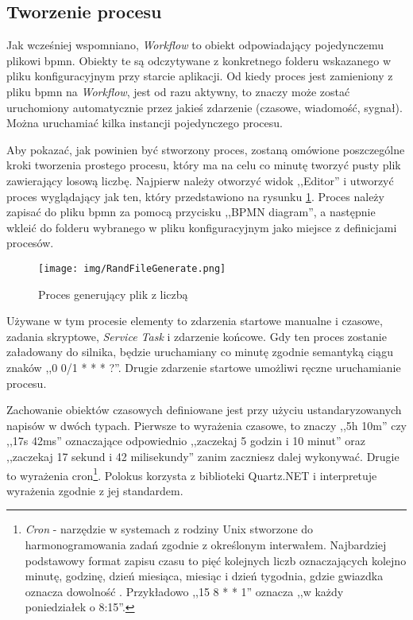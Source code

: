 \documentclass[declaration,shortabstract,mgr]{iithesis}
\begin{document}
\subsection*{Tworzenie procesu}

Jak wcześniej wspomniano, \textit{Workflow} to obiekt odpowiadający pojedynczemu plikowi bpmn. Obiekty te są odczytywane z konkretnego folderu wskazanego w pliku konfiguracyjnym przy starcie aplikacji. Od kiedy proces jest zamieniony z pliku bpmn na \textit{Workflow}, jest od razu aktywny, to znaczy może zostać uruchomiony automatycznie przez jakieś zdarzenie (czasowe, wiadomość, sygnał). Można uruchamiać kilka instancji pojedynczego procesu.

Aby pokazać, jak powinien być stworzony proces, zostaną omówione poszczególne kroki tworzenia prostego procesu, który ma na celu co minutę tworzyć pusty plik zawierający losową liczbę. Najpierw należy otworzyć widok ,,Editor'' i utworzyć proces wyglądający jak ten, który przedstawiono na rysunku \ref{fig:polokus-random-number}. Proces należy zapisać do pliku bpmn za pomocą przycisku ,,BPMN diagram'', a następnie wkleić do folderu wybranego w pliku konfiguracyjnym jako miejsce z definicjami procesów.

\begin{figure}[H]
    \texttt{[image: img/RandFileGenerate.png]}
    \caption{Proces generujący plik z liczbą}
    \label{fig:polokus-random-number}
\end{figure}

Używane w tym procesie elementy to zdarzenia startowe manualne i czasowe, zadania skryptowe, \textit{Service Task} i zdarzenie końcowe. Gdy ten proces zostanie załadowany do silnika, będzie uruchamiany co minutę zgodnie semantyką ciągu znaków ,,0 0/1 * * * ?''. Drugie zdarzenie startowe umożliwi ręczne uruchamianie procesu.

Zachowanie obiektów czasowych definiowane jest przy użyciu ustandaryzowanych napisów w dwóch typach. Pierwsze to wyrażenia czasowe, to znaczy ,,5h 10m'' czy ,,17s 42ms'' oznaczające odpowiednio ,,zaczekaj 5 godzin i 10 minut'' oraz ,,zaczekaj 17 sekund i 42 milisekundy'' zanim zaczniesz dalej wykonywać. Drugie to wyrażenia cron\footnote{\textit{Cron} - narzędzie w systemach z rodziny Unix stworzone do harmonogramowania zadań zgodnie z określonym interwałem. Najbardziej podstawowy format zapisu czasu to pięć kolejnych liczb oznaczających kolejno minutę, godzinę, dzień miesiąca, miesiąc i dzień tygodnia, gdzie gwiazdka oznacza dowolność \cite{wiki-cron}. Przykładowo ,,15 8 * * 1'' oznacza ,,w każdy poniedziałek o 8:15''.}. Polokus korzysta z biblioteki Quartz.NET i interpretuje wyrażenia zgodnie z jej standardem.
\end{document}
